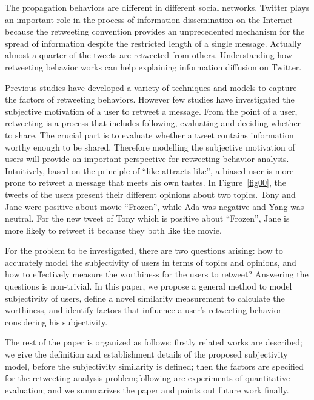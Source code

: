 \documentclass[letterpaper]{article}
\begin{document}
The propagation behaviors are different in different social networks. Twitter plays an important role in the process of information dissemination on the Internet because the retweeting convention provides an unprecedented mechanism for the spread of information despite the restricted length of a single message. 
Actually almost a quarter of the tweets are retweeted from others\cite{yang2010understanding}. 
Understanding how retweeting behavior works can help explaining information diffusion on Twitter. 

Previous studies have developed a variety of techniques and models to capture the factors of retweeting behaviors\cite{macskassy2011people,feng2013retweet}. However few studies have investigated the subjective motivation of a user to retweet a message. 
From the point of a user, retweeting is a process that includes following, evaluating and deciding whether to share. The crucial part is to evaluate whether a tweet contains information worthy enough to be shared.  
Therefore modelling the subjective motivation of users will provide an important perspective for retweeting behavior analysis. 
Intuitively, based on the principle of ``like attracts like'', a biased user is more prone to retweet a message that meets his own tastes. In Figure~\ref{fig00}, the tweets of the users present their different opinions about two topics. Tony and Jane were positive about movie ``Frozen'', while Ada was negative and Yang was neutral. For the new tweet of Tony which is positive about ``Frozen'', Jane is more likely to retweet it because they both like the movie. 

For the problem to be investigated, there are two questions arising: how to accurately model the subjectivity of users in terms of topics and opinions, and how to effectively measure the worthiness for the users to retweet? 
Answering the questions is non-trivial. 
In this paper, we propose a general method to model subjectivity of users, define a novel similarity measurement to calculate the worthiness,  and identify factors that influence a user's retweeting behavior considering his subjectivity. 

The rest of the paper is organized as follows: firstly related works are described; we give the definition and establishment details of the proposed subjectivity model, before the subjectivity similarity is defined; then the factors are specified for the retweeting analysis problem;following are experiments of quantitative evaluation; and we summarizes the paper and points out future work finally.
\end{document}

